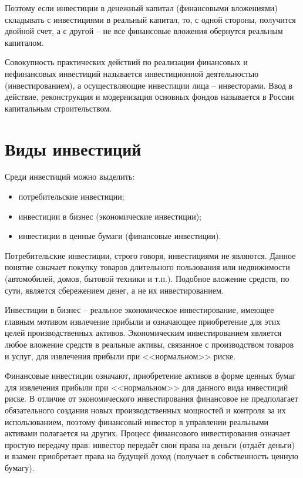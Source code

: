Поэтому если инвестиции в денежный капитал (финансовыми вложениями) складывать
с инвестициями в реальный капитал, то, с одной стороны, получится двойной счет,
а с другой -- не все финансовые вложения обернутся реальным капиталом.

Совокупность практических действий по реализации финансовых и нефинансовых
инвестиций называется инвестиционной деятельностью (инвестированием), а
осуществляющие инвестиции лица -- инвесторами. Ввод в действие, реконструкция и
модернизация основных фондов называется в России капитальным строительством.

\vspace*{2em}
\section{Виды инвестиций}

Среди инвестиций можно выделить:
\begin{itemize}
    \item потребительские инвестиции; 
    \item инвестиции в бизнес (экономические инвестиции); 
    \item инвестиции в ценные бумаги (финансовые инвестиции).
\end{itemize}

Потребительские инвестиции, строго говоря, инвестициями не являются. Данное
понятие означает покупку товаров длительного пользования или недвижимости
(автомобилей, домов, бытовой техники и т.п.). Подобное вложение средств, по
сути, является сбережением денег, а не их инвестированием.

Инвестиции в бизнес -- реальное экономическое инвестирование, имеющее главным
мотивом извлечение прибыли и означающее приобретение для этих целей
производственных активов. Экономическим инвестированием является любое вложение
средств в реальные активы, связанное с производством товаров и услуг, для
извлечения прибыли при <<нормальном>> риске.

Финансовые инвестиции означают, приобретение активов в форме ценных бумаг для
извлечения прибыли при <<нормальном>> для данного вида инвестиций риске. В
отличие от экономического инвестирования финансовое не предполагает
обязательного создания новых производственных мощностей и контроля за их
использованием, поэтому финансовый инвестор в управлении реальными активами
полагается на других. Процесс финансового инвестирования означает простую
передачу прав: инвестор передаёт свои права на деньги (отдаёт деньги) и взамен
приобретает права на будущей доход (получает в собственность ценную бумагу).

